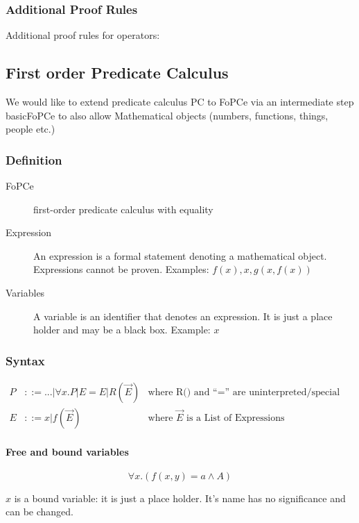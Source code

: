 \subsubsection{Additional Proof Rules}

Additional proof rules for operators: %


\subsection{First order Predicate Calculus}

We would like to extend predicate calculus PC to FoPCe via an intermediate step basicFoPCe to also allow Mathematical objects (numbers, functions, things, people etc.)

\subsubsection{Definition}

\begin{description}
	\item[FoPCe] first-order predicate calculus with equality
	\item[Expression] An expression is a formal statement denoting a mathematical object. Expressions cannot be proven. Examples: $f(x), x, g(x, f(x))$
	\item[Variables] A variable is an identifier that denotes an expression. It is just a place holder and may be a black box. Example: $x$
\end{description}

\subsubsection{Syntax}
\begin{align*}
	P &::= ...| \forall x.P | E = E | R(\vec{E}) 
	& \text{where R() and “=” are uninterpreted/special relationship symbols}\\
	E &::= x | f(\vec{E})
	& \text{where $\vec{E}$ is a List of Expressions}
\end{align*}	

\paragraph{Free and bound variables} \[
	\forall x .(f(x,y) = a \land A)
\]

$x$ is a bound variable: it is just a place holder. It's name has no significance and can be changed.

